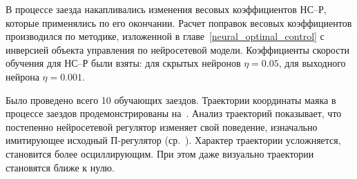 В процессе заезда накапливались изменения весовых коэффициентов НС--Р,
которые применялись по его окончании.  Расчет поправок весовых
коэффициентов производился по методике, изложенной в
главе~\ref{neural_optimal_control} с инверсией объекта управления по
нейросетевой модели.  Коэффициенты скорости обучения для НС--Р были
взяты: для скрытых нейронов $\eta=0.05$, для выходного нейрона
$\eta=0.001$.

Было проведено всего 10 обучающих заездов.  Траектории координаты
маяка в процессе заездов продемонстрированы
на~.  Анализ траекторий показывает,
что постепенно нейросетевой регулятор изменяет свой поведение,
изначально имитирующее исходный П-регулятор
(ср.~).  Характер траектории
усложняется, становится более осциллирующим.  При этом даже визуально
траектории становятся ближе к нулю.

